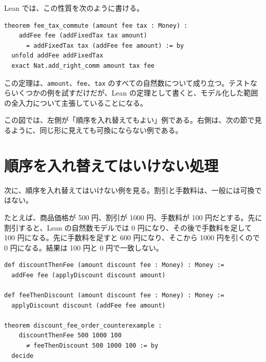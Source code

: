 Lean では、この性質を次のように書ける。

\begin{listing}[htbp]
\begin{verbatim}
theorem fee_tax_commute (amount fee tax : Money) :
    addFee fee (addFixedTax tax amount)
      = addFixedTax tax (addFee fee amount) := by
  unfold addFee addFixedTax
  exact Nat.add_right_comm amount tax fee
\end{verbatim}
\caption{固定税と固定手数料の順序交換}
\label{lst:ch20-fee-tax-commute}
\end{listing}

この定理は、\texttt{amount}、\texttt{fee}、\texttt{tax} のすべての自然数について成り立つ。テストならいくつかの例を試すだけだが、Lean の定理として書くと、モデル化した範囲の全入力について主張していることになる。


この図では、左側が「順序を入れ替えてもよい」例である。右側は、次の節で見るように、同じ形に見えても可換にならない例である。

\section{順序を入れ替えてはいけない処理}

次に、順序を入れ替えてはいけない例を見る。割引と手数料は、一般には可換ではない。

たとえば、商品価格が 500 円、割引が 1000 円、手数料が 100 円だとする。先に割引すると、Lean の自然数モデルでは 0 円になり、その後で手数料を足して 100 円になる。先に手数料を足すと 600 円になり、そこから 1000 円を引くので 0 円になる。結果は 100 円と 0 円で一致しない。

\begin{listing}[htbp]
\begin{verbatim}
def discountThenFee (amount discount fee : Money) : Money :=
  addFee fee (applyDiscount discount amount)

def feeThenDiscount (amount discount fee : Money) : Money :=
  applyDiscount discount (addFee fee amount)

theorem discount_fee_order_counterexample :
    discountThenFee 500 1000 100
      ≠ feeThenDiscount 500 1000 100 := by
  decide
\end{verbatim}
\caption{割引と手数料が可換でないことを示す反例}
\label{lst:ch20-discount-fee-counterexample}
\end{listing}

